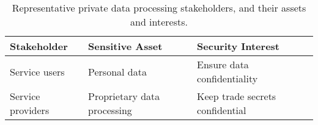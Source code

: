 \begin{wraptable}{r}{8.5cm}
  \vspace{-1em} \footnotesize \centering
  \begin{tabular}{lp{2.2cm}p{2.5cm}}
    \toprule 
    Stakeholder & Sensitive Asset & Security Interest \\ \midrule 
    Service users & Personal data & Ensure data confidentiality \\ 
    Service providers & Proprietary data processing & Keep trade secrets confidential \\
    \bottomrule
  \end{tabular} 
  \caption{Representative private data processing
  stakeholders, and their assets and interests.\vspace{-1em}}\label{table1}
\end{wraptable}
